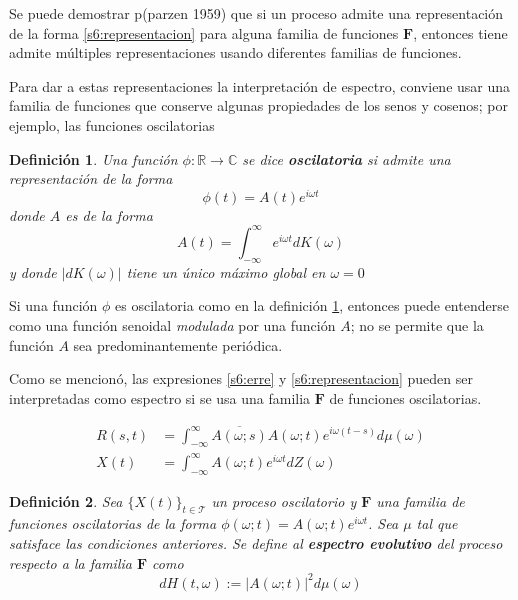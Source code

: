 \documentclass[12pt,letterpaper,draft]{book}
\newtheorem{definicion}{Definición}[chapter]
\newcommand{\R}{\mathbb{R}}
\newcommand{\C}{\mathbb{C}}
\newcommand{\intR}{\int_{-\infty}^{\infty}}
\newcommand{\ef}{\mathbf{F}}
\newcommand{\abso}[1]{\left| #1 \right|}
\newcommand{\xt}{$\{X(t)\}_{t\in \mathcal{T}}$ }
\begin{document}
Se puede demostrar p(parzen 1959) que si un proceso admite una representación de la forma \ref{s6:representacion} para alguna familia de funciones $\ef$, entonces tiene admite múltiples representaciones usando diferentes familias de funciones.

Para dar a estas representaciones la interpretación de espectro, conviene usar una familia de funciones que conserve algunas propiedades de los senos y cosenos; por ejemplo, las funciones oscilatorias

\begin{definicion}
Una función $\phi: \R \rightarrow \C$ se dice \textbf{oscilatoria} si admite una representación de la forma
\begin{equation}
\phi(t) = A(t) e^{i \omega t} 
\end{equation}
donde $A$ es de la forma
\begin{equation}
A(t) = \intR e^{i \omega t} dK(\omega)
\end{equation}
y donde $\abso{dK(\omega)}$ tiene un único máximo global en $\omega = 0$
\label{oscilatorio}
\end{definicion}

Si una función $\phi$ es oscilatoria como en la definición \ref{oscilatorio}, entonces puede entenderse como una función senoidal \textit{modulada} por una función $A$; no se permite que la función $A$ sea predominantemente periódica.

Como se mencionó, las expresiones \ref{s6:erre} y \ref{s6:representacion} pueden ser interpretadas como espectro si se usa una familia $\ef$ de funciones oscilatorias.

\begin{align}
R(s,t) &= \intR \overline{A(\omega; s)} A(\omega; t) e^{i\omega (t-s)} d\mu(\omega) \\
X(t) &= \intR A(\omega; t) e^{i \omega t} dZ(\omega)
\end{align}

\begin{definicion}
Sea \xt un proceso oscilatorio y $\ef$ una familia de funciones oscilatorias de la forma
$\phi(\omega;t) = A(\omega;t) e^{i \omega t}$. 
Sea $\mu$ tal que satisface las condiciones anteriores.
Se define al \textbf{espectro evolutivo} del proceso respecto a la familia $\ef$ como
\begin{equation}
dH(t,\omega) := \abso{A(\omega;t)}^{2} d\mu(\omega)
\end{equation}
\label{def:oscilatorio}
\end{definicion}
\end{document}
